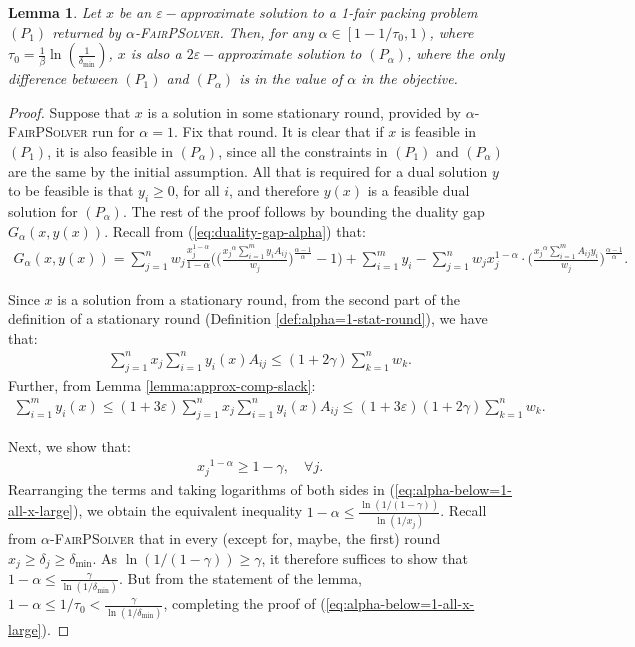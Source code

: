 \documentclass[11pt]{article}
\newtheorem{lemma}[theorem]{Lemma}
\newif\iffullpaper
\begin{document}
\begin{lemma}\label{lemma:alpha-close-to-1-below}
Let $x$ be an $\varepsilon-$approximate solution to a 1-fair packing problem $(P_1)$ returned by \textsc{$\alpha$-FairPSolver}. Then, for any $\alpha \in \left[1- 1/{\tau_0}, 1\right)$, where $\tau_0 = \frac{1}{\beta}\ln(\frac{1}{\delta_{\min}})$, $x$ is also a $2\varepsilon-$approximate solution to $(P_\alpha)$, where the only difference between $(P_1)$ and $(P_\alpha)$ is in the value of $\alpha$ in the objective.
\end{lemma}
\iffullpaper
\begin{proof}
Suppose that $x$ is a solution in some stationary round, provided by \textsc{$\alpha$-FairPSolver} run for $\alpha = 1$. Fix that round. It is clear that if $x$ is feasible in $(P_1)$, it is also feasible in $(P_\alpha)$, since all the constraints in $(P_1)$ and $(P_\alpha)$ are the same by the initial assumption. All that is required for a dual solution $y$ to be feasible is that $y_i \geq 0$, for all $i$, and therefore $y(x)$ is a feasible dual solution for $(P_\alpha)$. The rest of the proof follows by bounding the duality gap $G_\alpha(x, y(x))$. Recall from (\ref{eq:duality-gap-alpha}) that: 
\begin{align}\label{eq:duality-gap-alpha-recap}
G_{\alpha}(x, y(x)) = \sum_{j=1}^n w_j\frac{x_j^{1-\alpha}}{1-\alpha}\bigg(\Big(\frac{{x_j}^{\alpha}\sum_{i=1}^m y_i A_{ij}}{w_j}\Big)^{\frac{\alpha-1}{\alpha}}-1\bigg) +\sum_{i=1}^m y_i - \sum_{j=1}^n  w_j x_j^{1-\alpha}\cdot \Big(\frac{{x_j}^{\alpha}\sum_{i=1}^m A_{ij}y_i}{w_j}\Big)^{\frac{\alpha-1}{\alpha}}.
\end{align}

Since $x$ is a solution from a stationary round, from the second part of the definition of a stationary round (Definition \ref{def:alpha=1-stat-round}), we have that:
\begin{align*}
\sum_{j=1}^n x_j \sum_{i=1}^n y_i(x)A_{ij} \leq (1+2\gamma)\sum_{k=1}^n w_k.
\end{align*}
Further, from Lemma \ref{lemma:approx-comp-slack}:
\begin{align}
\sum_{i=1}^m y_i(x) \leq (1+3\varepsilon)\sum_{j=1}^n x_j \sum_{i=1}^n y_i(x)A_{ij} \leq (1+3\varepsilon)(1+2\gamma)\sum_{k=1}^n w_k. \label{eq:alpha-below-1-acs}
\end{align}

Next, we show that:
\begin{align}
{x_j}^{1-\alpha} \geq 1- \gamma,\quad \forall j. \label{eq:alpha-below=1-all-x-large}
\end{align}
Rearranging the terms and taking logarithms of both sides in (\ref{eq:alpha-below=1-all-x-large}), we obtain the  equivalent inequality $1-\alpha \leq \frac{\ln(1/(1-\gamma))}{\ln(1/x_j)}$. Recall from \textsc{$\alpha$-FairPSolver} that in every (except for, maybe, the first) round $x_j \geq \delta_j \geq \delta_{\min}$. As $\ln(1/(1-\gamma))\geq \gamma$, it therefore suffices to show that $1-\alpha \leq \frac{\gamma}{\ln(1/\delta_{\min})}$. But from the statement of the lemma, $1-\alpha\leq 1/\tau_0 < \frac{\gamma}{\ln(1/\delta_{\min})}$, completing the proof of (\ref{eq:alpha-below=1-all-x-large}).


\end{proof}
\end{document}
